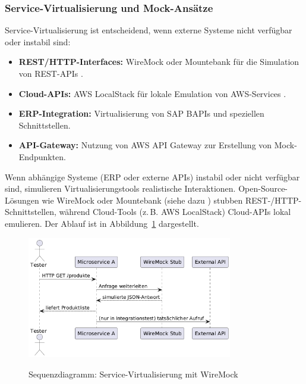 \subsubsection{Service-Virtualisierung und Mock-Ansätze}
Service-Virtualisierung ist entscheidend, wenn externe Systeme nicht verfügbar oder instabil sind:

\begin{itemize}
    \item \textbf{REST/HTTP-Interfaces:} WireMock oder Mountebank für die Simulation von REST-APIs
    \cite{wiremock2025}.
    \item \textbf{Cloud-APIs:} AWS LocalStack für lokale Emulation von AWS-Services \cite{aws2021}.
    \item \textbf{ERP-Integration:} Virtualisierung von SAP BAPIs und speziellen Schnittstellen.
    \item \textbf{API-Gateway:} Nutzung von AWS API Gateway zur Erstellung von Mock-Endpunkten.
\end{itemize}

Wenn abhängige Systeme (ERP oder externe APIs) instabil oder nicht verfügbar sind, simulieren
Virtualisierungstools realistische Interaktionen. Open-Source-Lösungen wie WireMock oder Mountebank
(siehe dazu \citet{byars2018}) stubben REST-/HTTP-Schnittstellen, während Cloud-Tools
(z.\,B. AWS LocalStack) Cloud-APIs lokal emulieren. Der Ablauf ist in Abbildung~\ref{fig:sequence}
dargestellt.\begin{figure}[h!]

\centering
\caption{Sequenzdiagramm: Service-Virtualisierung mit WireMock}
    \includegraphics[width=0.8\textwidth]{fig/servicevirti.png}
    \label{fig:sequence}
\end{figure}

\newpage

